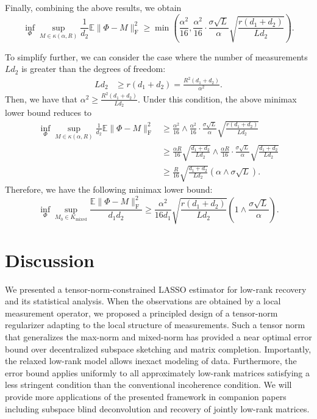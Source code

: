 \documentclass[11pt]{article}
\newcommand{\E}{\mathbb{E}}
\begin{document}
Finally, combining the above results, we obtain
\begin{equation*}
    {\inf_{\Phi}} {\sup_{M\in \kappa(\alpha, R)}} \frac{1}{d_2} \E \|\Phi - M\|_\mathrm{F}^2 \geq \min \left ( \frac{\alpha^2}{16},  \frac{\alpha^2}{16} \cdot \frac{\sigma\sqrt{L}}{\alpha} \sqrt{\frac{r(d_1 + d_2)}{L d_2}} \right ).
\end{equation*}

To simplify further, we can consider the case where the number of measurements $Ld_2$ is greater than the degrees of freedom: 
\begin{align*}
    Ld_2 & \geq r(d_1+d_2) = \frac{R^2(d_1+d_2)}{\alpha^2}.
\end{align*} 
Then, we have that $\alpha^2 \geq \frac{R^2(d_1+d_2)}{Ld_2}$. 
Under this condition, the above minimax lower bound reduces to
\begin{align*}
    {\inf_{\Phi}} {\sup_{M\in \kappa(\alpha, R)}} \frac{1}{d_2} \E \|\Phi - M\|_\mathrm{F}^2 
    & \geq \frac{\alpha^2}{16} \wedge \frac{\alpha^2}{16} \cdot \frac{\sigma\sqrt{L}}{\alpha} \sqrt{\frac{r(d_1 + d_2)}{L d_2}} \\
    & \geq \frac{\alpha R}{16} \sqrt{\frac{d_1+d_2}{Ld_2}} \wedge  \frac{\alpha R}{16} \cdot \frac{\sigma \sqrt{L}}{\alpha} \sqrt{\frac{d_1+d_2}{Ld_2}} \\
    & \geq  \frac{R}{16}\sqrt{\frac{d_1+d_2}{Ld_2}} \left ( \alpha \wedge \sigma \sqrt{L} \right ).
\end{align*}
Therefore, we have the following minimax lower bound:
\begin{equation*}
    {\inf_{\Phi}} \sup_{M_0 \in K_\mathrm{mixed}} \frac{\E \|\Phi - M\|_\mathrm{F}^2 }{d_1 d_2} \geq \frac{\alpha^2}{16 d_1} \sqrt{\frac{r(d_1 + d_2)}{L d_2}} \left( 1 \wedge \frac{\sigma\sqrt{L}}{\alpha}  \right).
\end{equation*}


\section{Discussion}

We presented a tensor-norm-constrained LASSO estimator for low-rank recovery and its statistical analysis. 
When the observations are obtained by a local measurement operator, we proposed a principled design of a tensor-norm regularizer adapting to the local structure of measurements. 
Such a tensor norm that generalizes the max-norm and mixed-norm has provided a near optimal error bound over decentralized subspace sketching and matrix completion. 
Importantly, the relaxed low-rank model allows inexact modeling of data. 
Furthermore, the error bound applies uniformly to all approximately low-rank matrices satisfying a less stringent condition than the conventional incoherence condition. 
We will provide more applications of the presented framework in companion papers including subspace blind deconvolution and recovery of jointly low-rank matrices.
\end{document}
